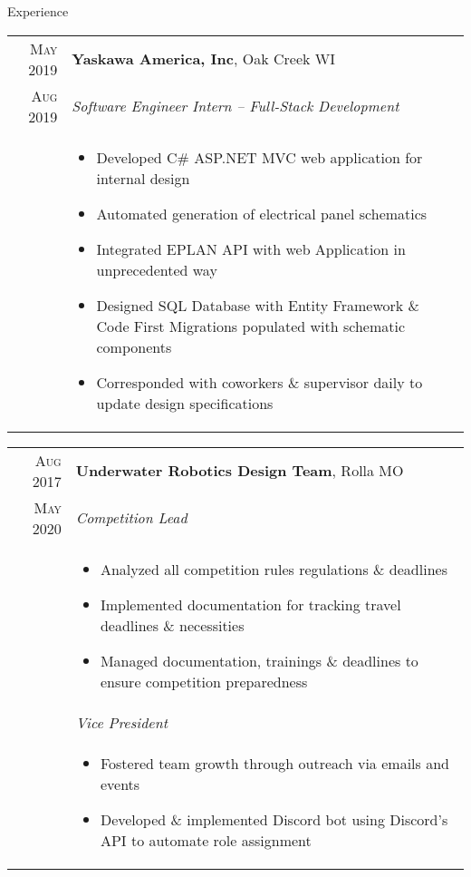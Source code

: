 \documentclass{resume}
\begin{document}
\begin{rSection}{Experience}
{  \begin{tabular}{r|p{15cm}}
    \textsc{May 2019} & \textbf{Yaskawa America, Inc}, Oak Creek WI \\
    \textsc{Aug 2019}  & \textit{Software Engineer Intern – Full-Stack Development} \\ &
    \begin{itemize}
        \item {Developed C\# ASP.NET MVC web application for internal design}
        \item {Automated generation of electrical panel schematics}
        \item {Integrated EPLAN API with web Application in unprecedented way}
        \item {Designed SQL Database with Entity Framework \& Code First Migrations populated with schematic components}
        \item {Corresponded with coworkers \& supervisor daily to update design specifications}
    \end{itemize}
  \end{tabular}
  
    \begin{tabular}{r|p{15cm}}
      \textsc{Aug 2017} & \textbf{Underwater Robotics Design Team}, Rolla MO \\
      \textsc{May 2020}  & \textit{Competition Lead} \\ &
      \begin{itemize}
          \item {Analyzed all competition rules regulations \& deadlines}
          \item {Implemented documentation for tracking travel deadlines \& necessities}
          \item {Managed documentation, trainings \& deadlines to ensure competition preparedness}
      \end{itemize}\\ &
      \textit{Vice President} \\ &
      \begin{itemize}
          \item {Fostered team growth through outreach via emails and events }
          \item {Developed \& implemented Discord bot using Discord's API to automate role assignment}
      \end{itemize}
    \end{tabular}
}
\end{rSection}
\end{document}
